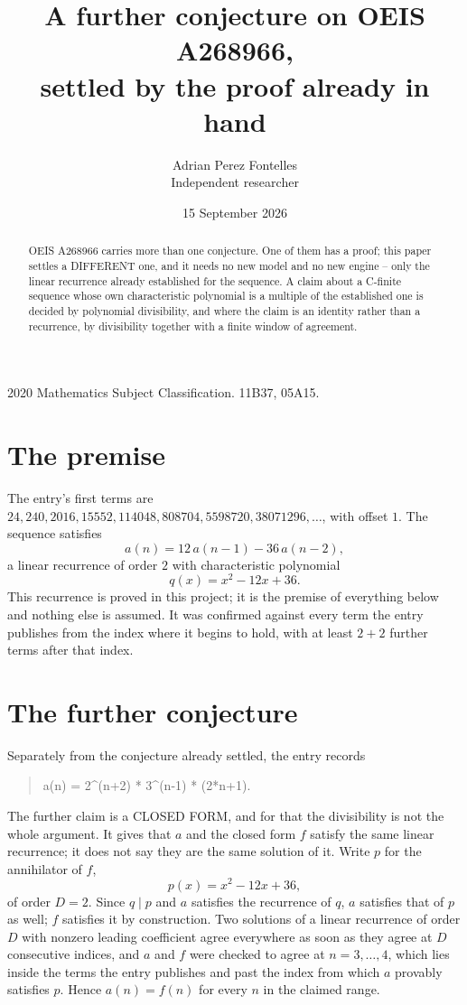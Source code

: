 \documentclass[11pt,a4paper]{article}
\title{A further conjecture on OEIS A268966,\\ \large settled by the proof already in hand}
\author{Adrian Perez Fontelles\\ \small Independent researcher}
\date{15 September 2026}
\theoremstyle{plain}
\theoremstyle{definition}
\begin{document}
\maketitle

\begin{abstract}
OEIS A268966 carries more than one conjecture. One of them has a proof; this paper settles a
DIFFERENT one, and it needs no new model and no new engine -- only the linear recurrence already
established for the sequence. A claim about a C-finite sequence whose own characteristic
polynomial is a multiple of the established one is decided by polynomial divisibility, and where
the claim is an identity rather than a recurrence, by divisibility together with a finite window
of agreement.
\end{abstract}

\noindent\small 2020 Mathematics Subject Classification. 11B37, 05A15.\normalsize

\section{The premise}

The entry's first terms are $24, 240, 2016, 15552, 114048, 808704, 5598720, 38071296,\dots$, with offset $1$. The sequence satisfies
\[
  a(n)=12\,a(n-1) - 36\,a(n-2) ,
\]
a linear recurrence of order $2$ with characteristic polynomial
\[
  q(x)=x^{2} - 12 x + 36 .
\]
This recurrence is proved in this project; it is the premise of everything below and nothing else is assumed.
It was confirmed against every term the entry publishes from the index where it begins to hold,
with at least $2+2$ further terms after that index.

\section{The further conjecture}

Separately from the conjecture already settled, the entry records

\begin{quote}\raggedright a(n) = 2\^{}(n+2) * 3\^{}(n-1) * (2*n+1).\end{quote}

The further claim is a CLOSED FORM, and for that the divisibility is not the whole argument. It
gives that $a$ and the closed form $f$ satisfy the same linear recurrence; it does not say they
are the same solution of it. Write $p$ for the annihilator of $f$,
\[
  p(x)=x^{2} - 12 x + 36 ,
\]
of order $D=2$. Since $q\mid p$ and $a$ satisfies the recurrence of $q$, $a$ satisfies that of
$p$ as well; $f$ satisfies it by construction. Two solutions of a linear recurrence of order $D$
with nonzero leading coefficient agree everywhere as soon as they agree at $D$ consecutive
indices, and $a$ and $f$ were checked to agree at $n=3,\dots,4$,
which lies inside the terms the entry publishes and past the index from which $a$ provably
satisfies $p$. Hence $a(n)=f(n)$ for every $n$ in the claimed range.
\end{document}
